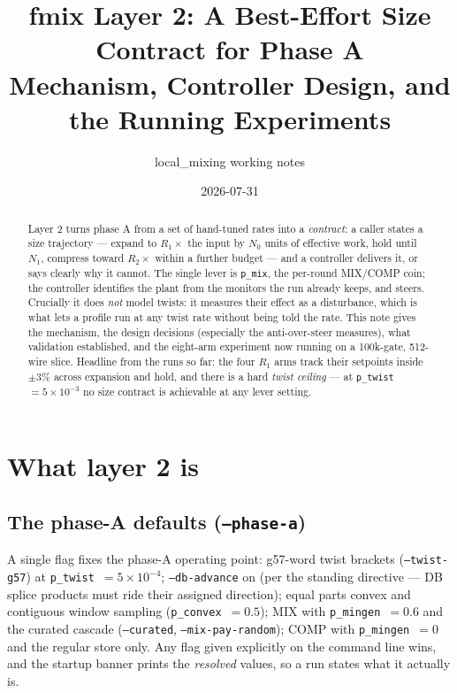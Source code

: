 \documentclass[11pt]{article}
\title{fmix Layer 2: A Best-Effort Size Contract for Phase A\\
\large Mechanism, Controller Design, and the Running Experiments}
\author{local\_mixing working notes}
\date{2026-07-31}
\newcommand{\code}[1]{\texttt{#1}}
\begin{document}
\maketitle

\begin{abstract}
Layer 2 turns phase A from a set of hand-tuned rates into a \emph{contract}:
a caller states a size trajectory --- expand to $R_1\times$ the input by
$N_0$ units of effective work, hold until $N_1$, compress toward
$R_2\times$ within a further budget --- and a controller delivers it, or
says clearly why it cannot. The single lever is \code{p\_mix}, the per-round
MIX/COMP coin; the controller identifies the plant from the monitors the
run already keeps, and steers. Crucially it does \emph{not} model twists:
it measures their effect as a disturbance, which is what lets a profile run
at any twist rate without being told the rate. This note gives the
mechanism, the design decisions (especially the anti-over-steer measures),
what validation established, and the eight-arm experiment now running on a
100k-gate, 512-wire slice. Headline from the runs so far: the four
$R_1$ arms track their setpoints inside $\pm 3\%$ across expansion and
hold, and there is a hard \emph{twist ceiling} --- at
\code{p\_twist}~$=5\times10^{-3}$ no size contract is achievable at any
lever setting.
\end{abstract}

\section{What layer 2 is}

\subsection{The phase-A defaults (\code{--phase-a})}

A single flag fixes the phase-A operating point: g57-word twist brackets
(\code{--twist-g57}) at \code{p\_twist}~$=5\times10^{-4}$;
\code{--db-advance} on (per the standing directive --- DB splice products
must ride their assigned direction); equal parts convex and contiguous
window sampling (\code{p\_convex}~$=0.5$); MIX with
\code{p\_mingen}~$=0.6$ and the curated cascade
(\code{--curated}, \code{--mix-pay-random}); COMP with
\code{p\_mingen}~$=0$ and the regular store only. Any flag given
explicitly on the command line wins, and the startup banner prints the
\emph{resolved} values, so a run states what it actually is.
\end{document}

